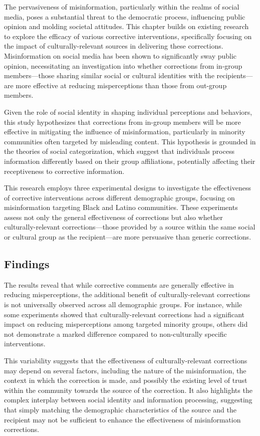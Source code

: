 \documentclass[12pt]{article}[1in]
\begin{document}
The pervasiveness of misinformation, particularly within the realms of social media, poses a substantial threat to the democratic process, influencing public opinion and molding societal attitudes. This chapter builds on existing research to explore the efficacy of various corrective interventions, specifically focusing on the impact of culturally-relevant sources in delivering these corrections. Misinformation on social media has been shown to significantly sway public opinion, necessitating an investigation into whether corrections from in-group members—those sharing similar social or cultural identities with the recipients—are more effective at reducing misperceptions than those from out-group members.

Given the role of social identity in shaping individual perceptions and behaviors, this study hypothesizes that corrections from in-group members will be more effective in mitigating the influence of misinformation, particularly in minority communities often targeted by misleading content. This hypothesis is grounded in the theories of social categorization, which suggest that individuals process information differently based on their group affiliations, potentially affecting their receptiveness to corrective information.

This research employs three experimental designs to investigate the effectiveness of corrective interventions across different demographic groups, focusing on misinformation targeting Black and Latino communities. These experiments assess not only the general effectiveness of corrections but also whether culturally-relevant corrections—those provided by a source within the same social or cultural group as the recipient—are more persuasive than generic corrections.


\subsection*{Findings}
The results reveal that while corrective comments are generally effective in reducing misperceptions, the additional benefit of culturally-relevant corrections is not universally observed across all demographic groups. For instance, while some experiments showed that culturally-relevant corrections had a significant impact on reducing misperceptions among targeted minority groups, others did not demonstrate a marked difference compared to non-culturally specific interventions.

This variability suggests that the effectiveness of culturally-relevant corrections may depend on several factors, including the nature of the misinformation, the context in which the correction is made, and possibly the existing level of trust within the community towards the source of the correction. It also highlights the complex interplay between social identity and information processing, suggesting that simply matching the demographic characteristics of the source and the recipient may not be sufficient to enhance the effectiveness of misinformation corrections.
\end{document}
